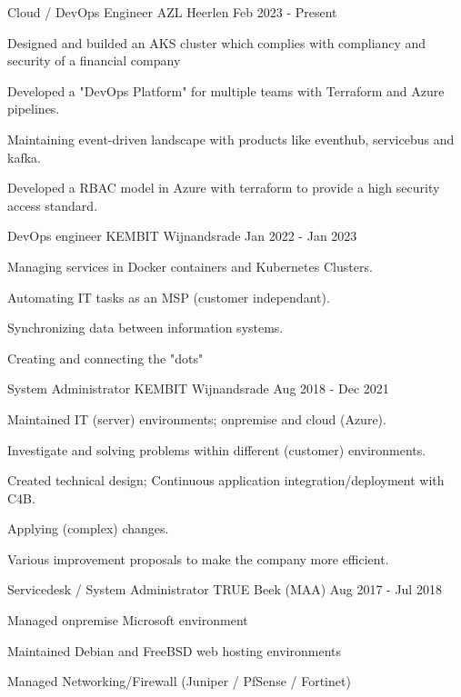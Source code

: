 \documentclass[11pt, letterpaper]{awesome-cv}
\begin{document}
\begin{cventries}


  \cventry
    {Cloud / DevOps Engineer}
    {AZL}
    {Heerlen}
    {Feb 2023 - Present}
    {
      \begin{cvitems}
        \item{Designed and builded an AKS cluster which complies with compliancy and security of a financial company}
        \item{Developed a "DevOps Platform" for multiple teams with Terraform and Azure pipelines.}
        \item{Maintaining event-driven landscape with products like eventhub, servicebus and kafka.}
        \item{Developed a RBAC model in Azure with terraform to provide a high security access standard.}
      \end{cvitems}
    }


  \cventry
    {DevOps engineer}
    {KEMBIT}
    {Wijnandsrade}
    {Jan 2022 - Jan 2023}
    {
      \begin{cvitems}
        \item{Managing services in Docker containers and Kubernetes Clusters.}
        \item{Automating IT tasks as an MSP (customer independant).}
        \item{Synchronizing data between information systems.}
        \item{Creating and connecting the "dots"}
      \end{cvitems}
    }


  \cventry
    {System Administrator}
    {KEMBIT}
    {Wijnandsrade}
    {Aug 2018 - Dec 2021}
    {
      \begin{cvitems}
        \item{Maintained IT (server) environments; onpremise and cloud (Azure).}
        \item{Investigate and solving problems within different (customer) environments.}
        \item{Created technical design; Continuous application integration/deployment with C4B.}
        \item{Applying (complex) changes.}
        \item{Various improvement proposals to make the company more efficient.}
      \end{cvitems}
    }


  \cventry
    {Servicedesk / System Administrator}
    {TRUE}
    {Beek (MAA)}
    {Aug 2017 - Jul 2018}
    {
      \begin{cvitems}
        \item{Managed onpremise Microsoft environment}
        \item{Maintained Debian and FreeBSD web hosting environments}
        \item{Managed Networking/Firewall (Juniper / PfSense / Fortinet)}
      \end{cvitems}
    }



\end{cventries}
\end{document}

